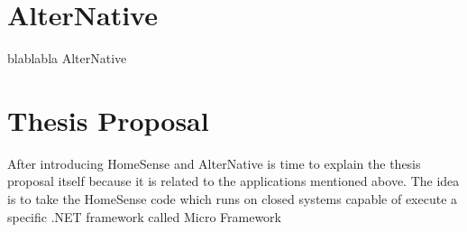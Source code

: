 \section{AlterNative}\label{S:Proposal-AlterNative}
blablabla AlterNative

\section{Thesis Proposal}\label{S:Proposal-Thesis-Proposal}
After introducing HomeSense and AlterNative is time to explain the thesis proposal itself because it is related to the applications mentioned above. The idea is to take the HomeSense code which runs on closed systems capable of execute a specific .NET framework called Micro Framework